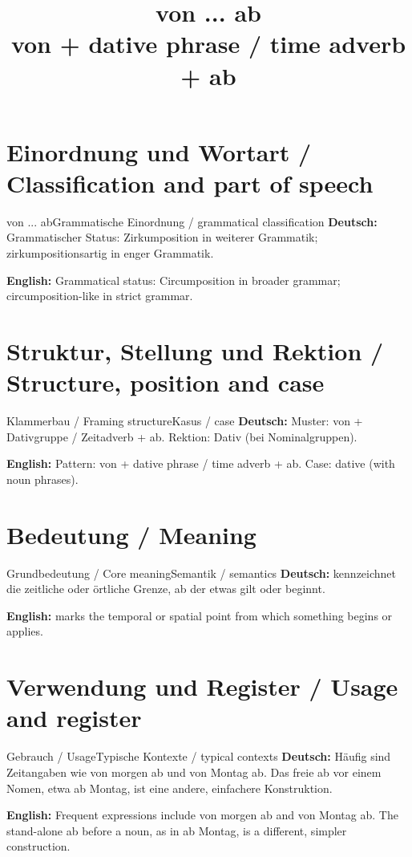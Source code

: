 \documentclass[a4paper,11pt]{article}
\title{von ... ab\\ \large von + dative phrase / time adverb + ab}
\date{}
\newcommand{\GermanText}[1]{\textbf{Deutsch: }#1\par}
\newcommand{\EnglishText}[1]{{\small\color{SoftGray}\textbf{English: }#1\par}}
\begin{document}
\maketitle
\tableofcontents
\newpage
\section{Einordnung und Wortart / Classification and part of speech}
\begin{grammarentry}{von ... ab}{Grammatische Einordnung / grammatical classification}
\GermanText{Grammatischer Status: Zirkumposition in weiterer Grammatik; zirkumpositionsartig in enger Grammatik.}
\EnglishText{Grammatical status: Circumposition in broader grammar; circumposition-like in strict grammar.}
\end{grammarentry}
\section{Struktur, Stellung und Rektion / Structure, position and case}
\begin{grammarentry}{Klammerbau / Framing structure}{Kasus / case}
\GermanText{Muster: von + Dativgruppe / Zeitadverb + ab. Rektion: Dativ (bei Nominalgruppen).}
\EnglishText{Pattern: von + dative phrase / time adverb + ab. Case: dative (with noun phrases).}
\end{grammarentry}
\section{Bedeutung / Meaning}
\begin{grammarentry}{Grundbedeutung / Core meaning}{Semantik / semantics}
\GermanText{kennzeichnet die zeitliche oder örtliche Grenze, ab der etwas gilt oder beginnt.}
\EnglishText{marks the temporal or spatial point from which something begins or applies.}
\end{grammarentry}
\section{Verwendung und Register / Usage and register}
\begin{grammarentry}{Gebrauch / Usage}{Typische Kontexte / typical contexts}
\GermanText{Häufig sind Zeitangaben wie von morgen ab und von Montag ab. Das freie ab vor einem Nomen, etwa ab Montag, ist eine andere, einfachere Konstruktion.}
\EnglishText{Frequent expressions include von morgen ab and von Montag ab. The stand-alone ab before a noun, as in ab Montag, is a different, simpler construction.}
\end{grammarentry}
\end{document}
